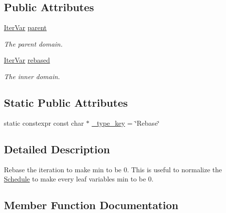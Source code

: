 \subsection*{Public Attributes}
\begin{DoxyCompactItemize}
\item 
\hyperlink{classtvm_1_1tir_1_1IterVar}{Iter\+Var} \hyperlink{classtvm_1_1te_1_1RebaseNode_a4fea0a62970e2831dd92c58aee14a1f4}{parent}
\begin{DoxyCompactList}\small\item\em The parent domain. \end{DoxyCompactList}\item 
\hyperlink{classtvm_1_1tir_1_1IterVar}{Iter\+Var} \hyperlink{classtvm_1_1te_1_1RebaseNode_a3e718d8fd2ae0f2d76b794e6dfa303f0}{rebased}
\begin{DoxyCompactList}\small\item\em The inner domain. \end{DoxyCompactList}\end{DoxyCompactItemize}
\subsection*{Static Public Attributes}
\begin{DoxyCompactItemize}
\item 
static constexpr const char $\ast$ \hyperlink{classtvm_1_1te_1_1RebaseNode_aead226ee7d9092dc0961fc7d639f6d7e}{\+\_\+type\+\_\+key} = \char`\"{}Rebase\char`\"{}
\end{DoxyCompactItemize}


\subsection{Detailed Description}
Rebase the iteration to make min to be 0. This is useful to normalize the \hyperlink{classtvm_1_1te_1_1Schedule}{Schedule} to make every leaf variable\textquotesingle{}s min to be 0. 

\subsection{Member Function Documentation}

